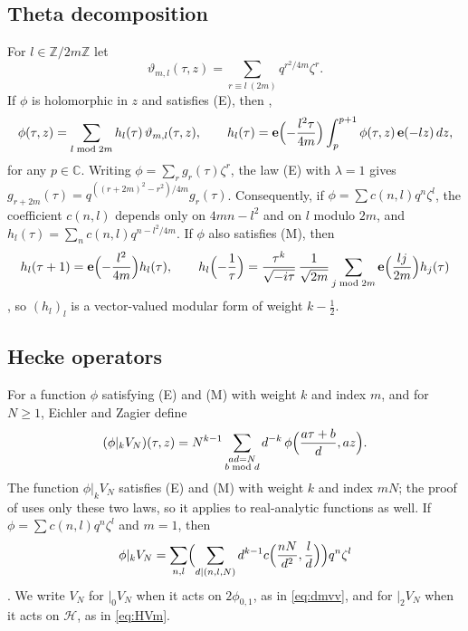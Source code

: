 \documentclass[11pt]{amsart}
\theoremstyle{definition}
\newcommand{\ZZ}{\mathbb{Z}}
\newcommand{\CC}{\mathbb{C}}
\newcommand{\vt}{\vartheta}
\newcommand{\Hc}{\mathcal{H}}
\newcommand{\e}{\mathbf{e}}
\begin{document}
\subsection{Theta decomposition}
For $l\in\ZZ/2m\ZZ$ let
\[
\vt_{m,l}(\tau,z)=\sum_{r\equiv l\ (2m)}q^{r^2/4m}\zeta^r .
\]
If $\phi$ is holomorphic in $z$ and satisfies (E), then \cite[Thm.~3.1]{Zwe02}, \cite[\S5]{EZ85}
\begin{equation}\label{eq:thetadec}
\phi(\tau,z)=\sum_{l\bmod 2m}h_l(\tau)\,\vt_{m,l}(\tau,z),\qquad h_l(\tau)=\e\Bigl(-\frac{l^2\tau}{4m}\Bigr)\int_p^{p+1}\phi(\tau,z)\,\e(-lz)\,dz,
\end{equation}
for any $p\in\CC$. Writing $\phi=\sum_r g_r(\tau)\zeta^r$, the law (E) with $\lambda=1$ gives $g_{r+2m}(\tau)=q^{((r+2m)^2-r^2)/4m}g_r(\tau)$. Consequently, if $\phi=\sum c(n,l)q^n\zeta^l$, the coefficient $c(n,l)$ depends only on $4mn-l^2$ and on $l$ modulo $2m$, and $h_l(\tau)=\sum_n c(n,l)q^{n-l^2/4m}$. If $\phi$ also satisfies (M), then
\begin{equation}\label{eq:hmod}
h_l(\tau+1)=\e\Bigl(-\frac{l^2}{4m}\Bigr)h_l(\tau),\qquad h_l\Bigl(-\frac1\tau\Bigr)=\frac{\tau^k}{\sqrt{-i\tau}}\,\frac{1}{\sqrt{2m}}\sum_{j\bmod 2m}\e\Bigl(\frac{lj}{2m}\Bigr)h_j(\tau)
\end{equation}
\cite[(3.3), (3.4)]{Zwe02}, so $(h_l)_l$ is a vector-valued modular form of weight $k-\frac12$.

\subsection{Hecke operators}
For a function $\phi$ satisfying (E) and (M) with weight $k$ and index $m$, and for $N\ge1$, Eichler and Zagier define
\[
(\phi|_kV_N)(\tau,z)=N^{k-1}\sum_{\substack{ad=N\\ b\bmod d}}d^{-k}\,\phi\Bigl(\frac{a\tau+b}{d},az\Bigr).
\]
The function $\phi|_kV_N$ satisfies (E) and (M) with weight $k$ and index $mN$; the proof of \cite[Thm.~4.2]{EZ85} uses only these two laws, so it applies to real-analytic functions as well. If $\phi=\sum c(n,l)q^n\zeta^l$ and $m=1$, then
\begin{equation}\label{eq:heckecoef}
\phi|_kV_N=\sum_{n,l}\Bigl(\sum_{d\mid(n,l,N)}d^{k-1}c\Bigl(\frac{nN}{d^2},\frac ld\Bigr)\Bigr)q^n\zeta^l
\end{equation}
\cite[Thm.~4.2]{EZ85}. We write $V_N$ for $|_0V_N$ when it acts on $2\phi_{0,1}$, as in \eqref{eq:dmvv}, and for $|_2V_N$ when it acts on $\Hc$, as in \eqref{eq:HVm}.
\end{document}
